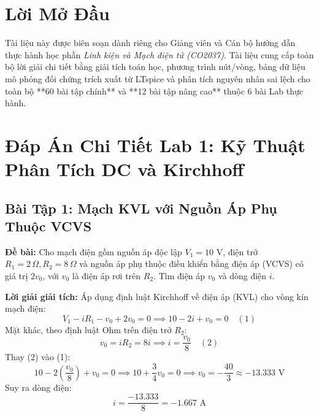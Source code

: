 \documentclass[12pt,a4paper]{report}
\begin{document}
\tableofcontents
\newpage
{}

\chapter*{Lời Mở Đầu}
Tài liệu này được biên soạn dành riêng cho Giảng viên và Cán bộ hướng dẫn thực hành học phần \textit{Linh kiện và Mạch điện tử (CO2037)}. Tài liệu cung cấp toàn bộ lời giải chi tiết bằng giải tích toán học, phương trình nút/vòng, bảng dữ liệu mô phỏng đối chứng trích xuất từ LTspice và phân tích nguyên nhân sai lệch cho toàn bộ **60 bài tập chính** và **12 bài tập nâng cao** thuộc 6 bài Lab thực hành.

\chapter{Đáp Án Chi Tiết Lab 1: Kỹ Thuật Phân Tích DC và Kirchhoff}

\section{Bài Tập 1: Mạch KVL với Nguồn Áp Phụ Thuộc VCVS}
\textbf{Đề bài:} Cho mạch điện gồm nguồn áp độc lập $V_1 = 10\text{ V}$, điện trở $R_1 = 2\,\Omega, R_2 = 8\,\Omega$ và nguồn áp phụ thuộc điều khiển bằng điện áp (VCVS) có giá trị $2v_0$, với $v_0$ là điện áp rơi trên $R_2$. Tìm điện áp $v_0$ và dòng điện $i$.

\textbf{Lời giải giải tích:}
Áp dụng định luật Kirchhoff về điện áp (KVL) cho vòng kín mạch điện:
\begin{equation}
    V_1 - i R_1 - v_0 + 2 v_0 = 0 \implies 10 - 2i + v_0 = 0 \quad (1)
\end{equation}
Mặt khác, theo định luật Ohm trên điện trở $R_2$:
\begin{equation}
    v_0 = i R_2 = 8i \implies i = \frac{v_0}{8} \quad (2)
\end{equation}
Thay (2) vào (1):
\begin{equation}
    10 - 2\left(\frac{v_0}{8}\right) + v_0 = 0 \implies 10 + \frac{3}{4} v_0 = 0 \implies v_0 = -\frac{40}{3} \approx -13.333\text{ V}
\end{equation}
Suy ra dòng điện:
\begin{equation}
    i = \frac{-13.333}{8} = -1.667\text{ A}
\end{equation}
\end{document}
